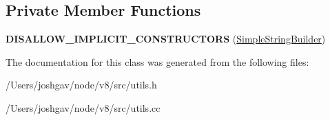 \subsection*{Private Member Functions}
\begin{DoxyCompactItemize}
\item 
{\bfseries D\+I\+S\+A\+L\+L\+O\+W\+\_\+\+I\+M\+P\+L\+I\+C\+I\+T\+\_\+\+C\+O\+N\+S\+T\+R\+U\+C\+T\+O\+RS} (\hyperlink{classv8_1_1internal_1_1_simple_string_builder}{Simple\+String\+Builder})\hypertarget{classv8_1_1internal_1_1_simple_string_builder_a3c2aa4cb1b9f5bc01a7763de5d1373ee}{}\label{classv8_1_1internal_1_1_simple_string_builder_a3c2aa4cb1b9f5bc01a7763de5d1373ee}

\end{DoxyCompactItemize}


The documentation for this class was generated from the following files\+:\begin{DoxyCompactItemize}
\item 
/\+Users/joshgav/node/v8/src/utils.\+h\item 
/\+Users/joshgav/node/v8/src/utils.\+cc\end{DoxyCompactItemize}
